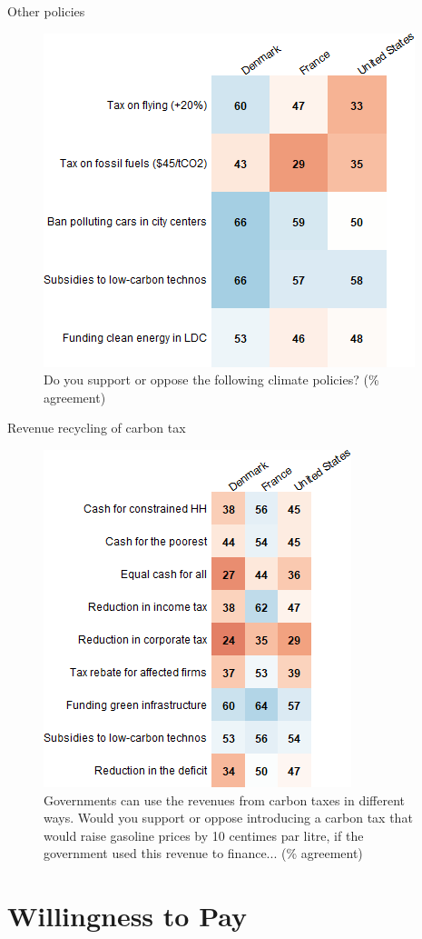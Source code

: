 \documentclass[aspectratio=169,9pt,dvipsnames]{beamer}
\begin{document}
\begin{frame}{Other policies}%
\begin{figure}[h!]
\centering
\caption{Do you support or oppose the following climate policies? (\% agreement)}
\vspace{2mm}
\includegraphics[width=.5\textwidth]{../figures/country_comparison/policy_positive_countries.png}
\end{figure}
\end{frame}

\begin{frame}{Revenue recycling of carbon tax}%
\begin{figure}[h!]
\centering
\caption{Governments can use the revenues from carbon taxes in different ways. Would you support or oppose introducing a carbon tax that would raise gasoline prices by 10 centimes par litre, if the government used this revenue to finance... (\% agreement)}
\vspace{2mm}
\includegraphics[width=.4\textwidth]{../figures/country_comparison/tax_positive_countries.png}
\end{figure}
\end{frame}

\section{Willingness to Pay}
\end{document}
